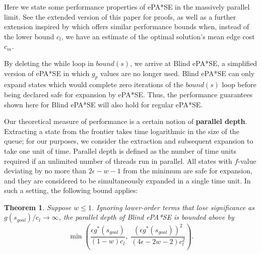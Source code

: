 \documentclass[letterpaper]{article}
\newtheorem{thm}{Theorem}
\begin{document}
Here we state some performance properties of ePA*SE in the massively parallel limit. See the extended version of this paper for proofs, as well as a further extension inspired by \cite{klein1997randomized} which offers similar performance bounds when, instead of the lower bound $c_l$, we have an estimate of the optimal solution's mean edge cost $c_m$.

By deleting the while loop in $bound(s)$, we arrive at Blind ePA*SE, a simplified version of ePA*SE in which $g_p$ values are no longer used. Blind ePA*SE can only expand states which would complete zero iterations of the $bound(s)$ loop before being declared safe for expansion by ePA*SE. Thus, the performance guarantees shown here for Blind ePA*SE will also hold for regular ePA*SE.

Our theoretical measure of performance is a certain notion of \textbf{parallel depth}. Extracting a state from the frontier takes time logarithmic in the size of the queue; for our purposes, we consider the extraction and subsequent expansion to take one unit of time. Parallel depth is defined as the number of time units required if an unlimited number of threads run in parallel. All states with $f$-value deviating by no more than $2\epsilon-w-1$ from the minimum are safe for expansion, and they are considered to be simultaneously expanded in a single time unit. In such a setting, the following bound applies:

\begin{thm}
\label{thm:depth}
Suppose $w \le 1$. Ignoring lower-order terms that lose significance as $g(s_{goal})/c_l \rightarrow \infty$, the parallel depth of Blind ePA*SE is bounded above by
\[\min\left(\frac{\epsilon g^*(s_{goal})}{(1-w)c_l},\;
\frac{\left(\epsilon g^*(s_{goal})\right)^2 }{(4\epsilon-2w-2)c_l^2}\right).\]
\end{thm}
\end{document}
